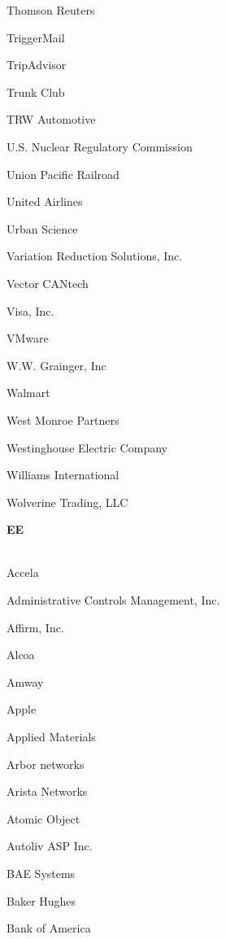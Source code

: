 \documentclass[twoside]{article}
\begin{document}
\begin{center}
\begin{multicols}{5}
\begin{FlushLeft}
\begin{compactitem}
\item Thomson Reuters
\item TriggerMail
\item TripAdvisor
\item Trunk Club
\item TRW Automotive
\item U.S. Nuclear Regulatory Commission
\item Union Pacific Railroad
\item United Airlines
\item Urban Science
\item Variation Reduction Solutions, Inc.
\item Vector CANtech
\item Visa, Inc.
\item VMware
\item W.W. Grainger, Inc
\item Walmart
\item West Monroe Partners
\item Westinghouse Electric Company
\item Williams International
\item Wolverine Trading, LLC
\end{compactitem}
        \end{FlushLeft}
        \vspace{1em}
        {\fontsize{14}{16}\selectfont \bf EE}\\
        \vspace{-1em}
        ~\hrulefill~
        \vspace{-.9em}
        \begin{FlushLeft}
        \begin{compactitem}
        \item Accela
\item Administrative Controls Management, Inc.
\item Affirm, Inc.
\item Alcoa
\item Amway
\item Apple
\item Applied Materials
\item Arbor networks
\item Arista Networks
\item Atomic Object
\item Autoliv ASP Inc.
\item BAE Systems
\item Baker Hughes
\item Bank of America

\end{compactitem}
\end{FlushLeft}
\end{multicols}
\end{center}
\end{document}
